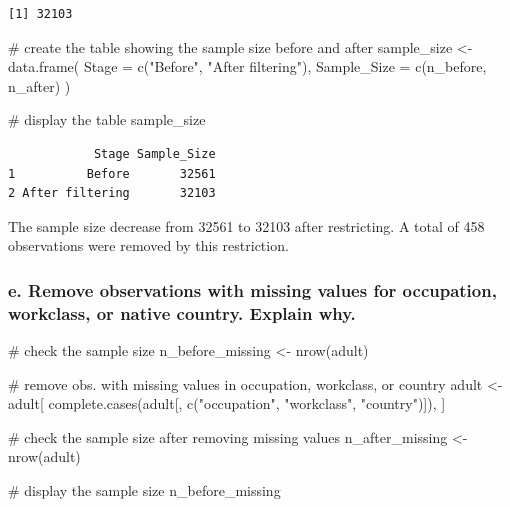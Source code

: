 \documentclass[
  letterpaper,
  DIV=11,
  numbers=noendperiod]{scrartcl}
\newenvironment{Shaded}{\begin{snugshade}}{\end{snugshade}}
\newcommand{\AttributeTok}[1]{\textcolor[rgb]{0.40,0.45,0.13}{#1}}
\newcommand{\CommentTok}[1]{\textcolor[rgb]{0.37,0.37,0.37}{#1}}
\newcommand{\FunctionTok}[1]{\textcolor[rgb]{0.28,0.35,0.67}{#1}}
\newcommand{\NormalTok}[1]{\textcolor[rgb]{0.00,0.23,0.31}{#1}}
\newcommand{\OtherTok}[1]{\textcolor[rgb]{0.00,0.23,0.31}{#1}}
\newcommand{\StringTok}[1]{\textcolor[rgb]{0.13,0.47,0.30}{#1}}
\begin{document}
\begin{verbatim}
[1] 32103
\end{verbatim}

\begin{Shaded}
\begin{Highlighting}[]
\CommentTok{\# create the table showing the sample size before and after}
\NormalTok{sample\_size }\OtherTok{\textless{}{-}} \FunctionTok{data.frame}\NormalTok{(}
  \AttributeTok{Stage =} \FunctionTok{c}\NormalTok{(}\StringTok{"Before"}\NormalTok{, }\StringTok{"After filtering"}\NormalTok{),}
  \AttributeTok{Sample\_Size =} \FunctionTok{c}\NormalTok{(n\_before, n\_after)}
\NormalTok{)}

\CommentTok{\# display the table}
\NormalTok{sample\_size}
\end{Highlighting}
\end{Shaded}

\begin{verbatim}
            Stage Sample_Size
1          Before       32561
2 After filtering       32103
\end{verbatim}

The sample size decrease from 32561 to 32103 after restricting. A total
of 458 observations were removed by this restriction.

\subsubsection{e. Remove observations with missing values for
occupation, workclass, or native country. Explain
why.}\label{e.-remove-observations-with-missing-values-for-occupation-workclass-or-native-country.-explain-why.}

\begin{Shaded}
\begin{Highlighting}[]
\CommentTok{\# check the sample size}
\NormalTok{n\_before\_missing }\OtherTok{\textless{}{-}} \FunctionTok{nrow}\NormalTok{(adult)}

\CommentTok{\# remove obs. with missing values in occupation, workclass, or country}
\NormalTok{adult }\OtherTok{\textless{}{-}}\NormalTok{ adult[}
  \FunctionTok{complete.cases}\NormalTok{(adult[, }\FunctionTok{c}\NormalTok{(}\StringTok{"occupation"}\NormalTok{, }\StringTok{"workclass"}\NormalTok{, }\StringTok{"country"}\NormalTok{)]),}
\NormalTok{]}

\CommentTok{\# check the sample size after removing missing values}
\NormalTok{n\_after\_missing }\OtherTok{\textless{}{-}} \FunctionTok{nrow}\NormalTok{(adult)}

\CommentTok{\# display the sample size}
\NormalTok{n\_before\_missing}
\end{Highlighting}
\end{Shaded}
\end{document}
